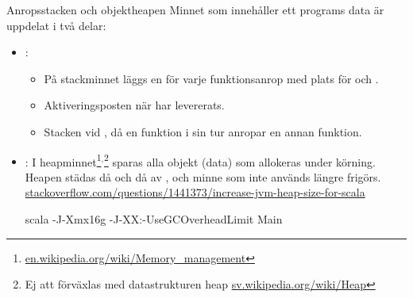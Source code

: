 \begin{Slide}{Anropsstacken och objektheapen}\SlideFontSmall
Minnet som innehåller ett programs data är uppdelat i två delar:
\begin{itemize}
\item {}: 
\begin{itemize}\SlideFontSmall
\item På stackminnet läggs en   för varje funktionsanrop med plats för  och .
\item Aktiveringsposten  när  har levererats.
\item Stacken  vid , då en funktion i sin tur anropar en annan funktion.
\end{itemize}
\item {}: I heapminnet\footnote{\href{https://en.wikipedia.org/wiki/Memory_management}{en.wikipedia.org/wiki/Memory\_management}}$^{,}$\footnote{Ej att förväxlas med datastrukturen heap  \href{https://sv.wikipedia.org/wiki/Heap}{sv.wikipedia.org/wiki/Heap}} sparas alla objekt (data) som allokeras under körning. Heapen städas då och då av  , och minne som inte används längre frigörs. \\\vspace{0.5em}
\href{https://stackoverflow.com/questions/1441373/increase-jvm-heap-size-for-scala}{stackoverflow.com/questions/1441373/increase-jvm-heap-size-for-scala}
\begin{REPLnonum}
scala -J-Xmx16g -J-XX:-UseGCOverheadLimit Main
\end{REPLnonum}
\end{itemize}
\end{Slide}

